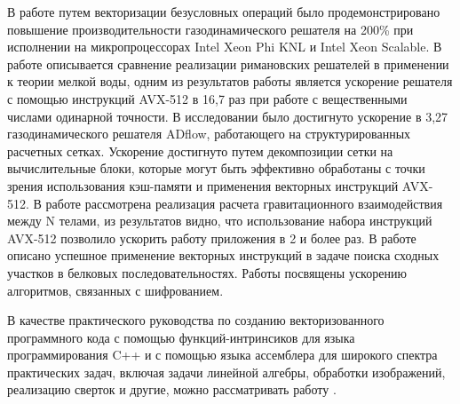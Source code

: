 В работе \cite{Kulikov2019VecAstro} путем векторизации безусловных операций было продемонстрировано повышение производительности газодинамического решателя на 200\% при исполнении на микропроцессорах Intel Xeon Phi KNL и Intel Xeon Scalable.
В работе \cite{Glinting2019VecSwim} описывается сравнение реализации римановских решателей\label{term:riemann_solver3} в применении к теории мелкой воды, одним из результатов работы является ускорение решателя с помощью инструкций AVX-512 в 16,7 раз при работе с вещественными числами одинарной точности.
В исследовании \cite{Yildirim2021VecCFD} было достигнуто ускорение в 3,27 газодинамического решателя ADflow, работающего на структурированных расчетных сетках.\label{term:mesh_block_struct5}
Ускорение достигнуто путем декомпозиции сетки на вычислительные блоки, которые могут быть эффективно обработаны с точки зрения использования кэш-памяти и применения векторных инструкций AVX-512.
В работе \cite{Rucci2020VecNBody} рассмотрена реализация расчета гравитационного взаимодействия между N телами, из результатов видно, что использование набора инструкций AVX-512 позволило ускорить работу приложения в 2 и более раз.
В работе \cite{Rucci2019VecSW} описано успешное применение векторных инструкций в задаче поиска сходных участков в белковых последовательностях.
Работы \cite{Choi2023VecKorean,Cheng2021VecCSIDH} посвящены ускорению алгоритмов, связанных с шифрованием.

В качестве практического руководства по созданию векторизованного программного кода с помощью функций-интринсиков для языка программирования C++ и с помощью языка ассемблера для широкого спектра практических задач, включая задачи линейной алгебры, обработки изображений, реализацию сверток и другие, можно рассматривать работу \cite{Kusswurm2022VecCpp}.

